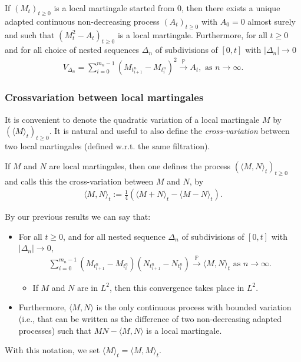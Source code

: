 \documentclass[../mainfile.tex]{subfiles}
\begin{document}
\begin{thm} If $(M_t)_{t \geq 0}$ is a local martingale started from $0$, then there exists a unique adapted continuous non-decreasing process $(A_t)_{t \geq 0}$ with $A_0=0$ almost surely and such that $(M_t^2-A_t)_{t \geq 0}$ is a local martingale. Furthermore, for all $t \geq 0$ and for all choice of nested sequences $\Delta_n$ of subdivisions of $[0,t]$ with $|\Delta_n| \to 0$ 
\begin{align*}
V_{\Delta_n} = \sum_{i=0}^{m_n-1} (M_{t_{i+1}^n}-M_{t_i^n})^2 \overset{\mathbb{P}}\longrightarrow A_t, \text{ as } n \to \infty. 
\end{align*}
\end{thm}
\subsubsection{Crossvariation between local martingales}
It is convenient to denote the quadratic variation of a local martingale $M$ by $( \langle M \rangle_t)_{t \geq 0}$. It is natural and useful to also define the \textit{cross-variation} between two local martingales (defined w.r.t. the same filtration). 
\begin{defn}[Crossvariation] If $M$ and $N$ are local martingales, then one defines the process $( \langle M, N \rangle_t )_{t \geq 0}$ and calls this the cross-variation between $M$ and $N$, by 
\begin{align*}
\langle M, N \rangle_t := \frac{1}{4} ( \langle M + N \rangle_t - \langle M-N \rangle_t). 
\end{align*}
\end{defn}
By our previous results we can say that:
\begin{itemize}
\item For all $t \geq 0$, and for all nested sequence $\Delta_n$ of subdivisions of $[0,t]$ with $|\Delta_n| \to 0$, 
\begin{align*}
\sum_{i=0}^{m_n-1} (M_{t_{i+1}^n}-M_{t_i^n})(N_{t_{i+1}^n}-N_{t_i^n}) \overset{\mathbb{P}}\to \langle M, N \rangle_t \text{ as } n \to \infty. 
\end{align*}
\begin{itemize}
\item If $M$ and $N$ are in $L^2$, then this convergence takes place in $L^2$.
\end{itemize}
\item Furthermore, $\langle M, N \rangle$ is the only continuous process with bounded variation (i.e., that can be written as the difference of two non-decreasing adapted processes) such that $MN- \langle M,N \rangle$ is a local martingale. 
\end{itemize}
\begin{rem} With this notation, we set $\langle M \rangle_t = \langle M, M \rangle_t.$
\end{rem}
\end{document}
